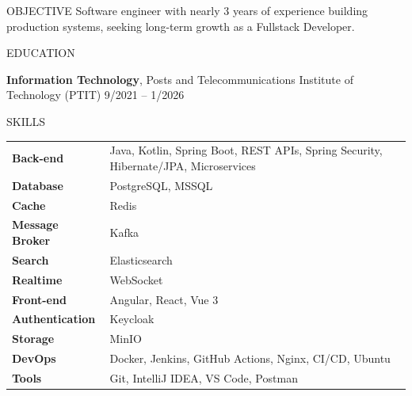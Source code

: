 \documentclass{resume}
\begin{document}
\begin{rSection}{OBJECTIVE}
Software engineer with nearly 3 years of experience building production systems, seeking long-term growth as a Fullstack Developer.
\end{rSection}


\begin{rSection}{EDUCATION}

\textbf{Information Technology}, Posts and Telecommunications Institute of Technology (PTIT) \hfill 9/2021 -- 1/2026\\

\end{rSection}

\begin{rSection}{SKILLS}

\begin{tabular}{ @{} >{\bfseries}p{} p{} }
Back-end & Java, Kotlin, Spring Boot, REST APIs, Spring Security, Hibernate/JPA, Microservices\\
Database & PostgreSQL, MSSQL\\
Cache & Redis\\
Message Broker & Kafka\\
Search & Elasticsearch\\
Realtime & WebSocket\\
Front-end & Angular, React, Vue 3\\
Authentication & Keycloak\\
Storage & MinIO\\
DevOps & Docker, Jenkins, GitHub Actions, Nginx, CI/CD, Ubuntu\\
Tools & Git, IntelliJ IDEA, VS Code, Postman\\
\end{tabular}\\
\end{rSection}
\end{document}
